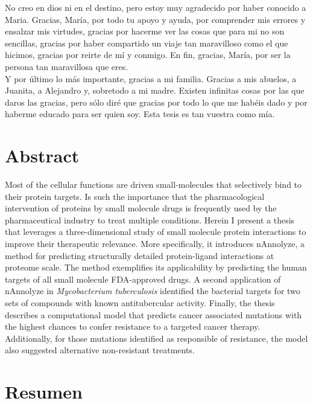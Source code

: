 \documentclass[11pt, b5paper,twoside]{tesi_upf}
\begin{document}
No creo en dios ni en el destino, pero estoy muy agradecido por haber conocido a Maria. Gracias,  María, por todo tu apoyo y ayuda, por comprender mis errores y ensalzar mis virtudes, gracias por hacerme ver las cosas que para mi no son sencillas, gracias por haber compartido un viaje tan maravilloso como el que hicimos, gracias por reirte de mí y conmigo. En fin, gracias, María, por ser la persona tan maravillosa que eres.\\ 
Y por último lo más importante, gracias a mi familia. Gracias a mis abuelos, a Juanita,  a Alejandro y, sobretodo a mi madre. Existen infinitas cosas por las que daros las gracias, pero sólo diré que gracias por todo lo que me habéis dado y por haberme educado para ser quien soy. Esta tesis es tan vuestra como mía.  




\clearpage
\section*{Abstract}

Most of the cellular functions are driven small-molecules that selectively bind to their protein targets. Is such the importance that the pharmacological intervention of proteins by small molecule drugs is frequently used by the pharmaceutical industry to treat multiple conditions. Herein I present a thesis that leverages a three-dimensional study of small molecule protein interactions to improve their therapeutic relevance. More specifically, it introduces nAnnolyze, a method for predicting structurally detailed protein-ligand interactions at proteome scale. The method exemplifies its applicability by predicting the human targets of all small molecule FDA-approved drugs. A second application of nAnnolyze in \textit{Mycobacterium tuberculosis} identified the bacterial targets for two sets of compounds with known antitubercular activity. Finally, the thesis describes a computational model that predicts cancer associated mutations with the highest chances to confer resistance to a targeted cancer therapy. Additionally, for those mutations identified as responsible of resistance, the model also suggested alternative non-resistant treatments. 

\vspace*{\fill}

\section*{Resumen}
\end{document}
